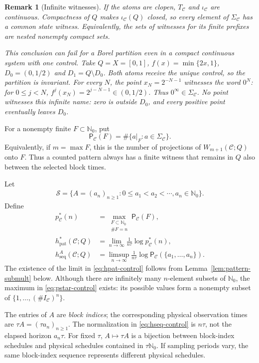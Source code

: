 \documentclass[11pt,reqno]{amsart}
\numberwithin{equation}{section}
\newtheorem{remark}[theorem]{Remark}
\theoremstyle{definition}
\newcommand{\Nzero}{\mathbb N_0}
\newcommand{\C}{\mathcal C}
\newcommand{\Patt}{\mathsf P}
\newcommand{\hseq}{h_{\mathrm{seq}}}
\newcommand{\hpat}{h_{\mathrm{pat}}^{*}}
\begin{document}
\begin{remark}[Infinite witnesses]\label{rem:witness}
If the atoms are clopen, $T_\C$ and $\iota_\C$ are continuous.
Compactness of $Q$ makes $\iota_\C(Q)$ closed, so every element of
$\Sigma_\C$ has a common state witness. Equivalently, the sets of witnesses
for its finite prefixes are nested nonempty compact sets.

This conclusion can fail for a Borel partition even in a compact
continuous system with one control. Take $Q=X=[0,1]$,
$f(x)=\min\{2x,1\}$, $D_0=(0,1/2)$ and $D_1=Q\setminus D_0$.
Both atoms receive the unique control, so the partition is invariant.
For every $N$, the point $x_N=2^{-N-1}$ witnesses the word $0^N$:
for $0\le j<N$, $f^j(x_N)=2^{j-N-1}\in(0,1/2)$.
Thus $0^\infty\in\Sigma_\C$. No point witnesses this infinite name:
zero is outside $D_0$, and every positive point eventually leaves $D_0$.
\end{remark}

For a nonempty finite $F\subset\Nzero$, put
\begin{equation}\label{eq:control-pattern-count}
 \Patt_\C(F)=\#\{a|_F:a\in\Sigma_\C\}.
\end{equation}
Equivalently, if $m=\max F$, this is the number of projections of
$W_{m+1}(\C;Q)$ onto $F$.  Thus a counted pattern always has a finite witness
that remains in $Q$ also between the selected block times.

Let
\begin{align*}
 \mathscr S=\{A=(a_n)_{n\ge1}:0\le a_1<a_2<\cdots, a_n\in\Nzero\}.
\end{align*}
Define
\begin{align}
 p_\C^*(n)&=\max_{\substack{F\subset\Nzero\\\#F=n}}\Patt_\C(F),
 \label{eq:pstar-control}\\
 \hpat(\C;Q)&=\lim_{n\to\infty}\frac1{n\tau}\log p_\C^*(n),
 \label{eq:hpat-control}\\
 \hseq^A(\C;Q)&=\limsup_{n\to\infty}\frac1{n\tau}
 \log\Patt_\C(\{a_1,\ldots,a_n\}).
 \label{eq:hseq-control}
\end{align}
The existence of the limit in \eqref{eq:hpat-control} follows from
Lemma~\ref{lem:pattern-submult} below.  Although there are infinitely many
$n$-element subsets of $\Nzero$, the maximum in \eqref{eq:pstar-control}
exists: its possible values form a nonempty subset of
$\{1,\ldots,(\#I_\C)^n\}$.

The entries of $A$ are \emph{block indices}; the corresponding physical
observation times are $\tau A=(\tau a_n)_{n\ge1}$.  The normalization in
\eqref{eq:hseq-control} is $n\tau$, not the elapsed horizon $a_n\tau$.
For fixed $\tau$, $A\mapsto\tau A$ is a bijection between block-index
schedules and physical schedules contained in $\tau\Nzero$.  If sampling
periods vary, the same block-index sequence represents different physical
schedules.
\end{document}
